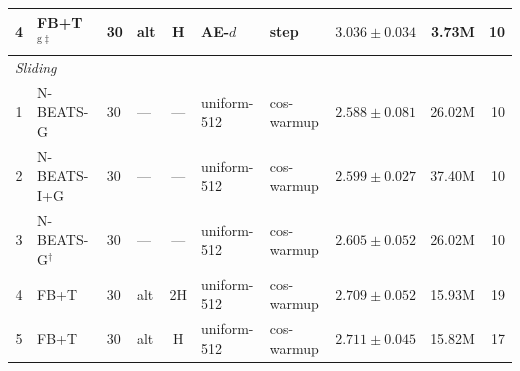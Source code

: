 \begin{table}[h]
{\begin{tabular}{@{}clllcllrrr@{}}
    4 & FB+T$^{\mathrm{g}\ddag}$   & 30 & alt         & H & AE-$d$      & step    & $3.036 \pm 0.034$          & 3.73M  & 10 \\
    \midrule
    \multicolumn{10}{l}{\textit{Sliding}} \\
    \midrule
    1 & N-BEATS-G                  & 30 & --- & --- & uniform-512 & cos-warmup & $\mathbf{2.588 \pm 0.081}$ & 26.02M & 10 \\
    2 & N-BEATS-I+G                & 30 & --- & --- & uniform-512 & cos-warmup & $2.599 \pm 0.027$          & 37.40M & 10 \\
    3 & N-BEATS-G$^{\dag}$         & 30 & --- & --- & uniform-512 & cos-warmup & $2.605 \pm 0.052$          & 26.02M & 10 \\
    4 & FB+T                       & 30 & alt & 2H  & uniform-512 & cos-warmup & $2.709 \pm 0.052$          & 15.93M & 19 \\
    5 & FB+T                       & 30 & alt & H   & uniform-512 & cos-warmup & $2.711 \pm 0.045$          & 15.82M & 17 \\
    \bottomrule
  \end{tabular}}
\end{table}